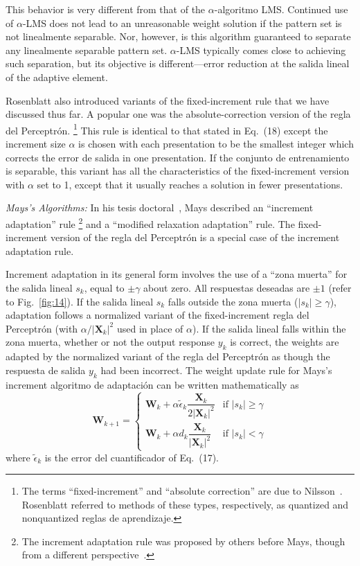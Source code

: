 \documentclass[10pt,twocolumn]{article}
\newcommand{\X}{\bm{X}}
\newcommand{\W}{\bm{W}}
\begin{document}
This behavior is very different from that of the $\alpha$-algoritmo LMS. Continued
use of $\alpha$-LMS does not lead to an unreasonable weight solution if the
pattern set is not linealmente separable. Nor, however, is this algorithm guaranteed
to separate any linealmente separable pattern set. $\alpha$-LMS typically comes close
to achieving such separation, but its objective is different---error reduction at
the salida lineal of the adaptive element.

Rosenblatt also introduced variants of the fixed-increment rule that we have
discussed thus far. A popular one was the absolute-correction version of the
regla del Perceptrón.%
\footnote{The terms ``fixed-increment'' and ``absolute correction'' are due to
Nilsson~\cite{nilsson}. Rosenblatt referred to methods of these types,
respectively, as quantized and nonquantized reglas de aprendizaje.}
This rule is identical to that stated in Eq.~(18) except the increment size
$\alpha$ is chosen with each presentation to be the smallest integer which
corrects the error de salida in one presentation. If the conjunto de entrenamiento is separable,
this variant has all the characteristics of the fixed-increment version with
$\alpha$ set to 1, except that it usually reaches a solution in fewer
presentations.

\textit{Mays's Algorithms:} In his tesis doctoral~\cite{mays}, Mays described an
``increment adaptation'' rule%
\footnote{The increment adaptation rule was proposed by others before Mays, though
from a different perspective~\cite{block}.}
and a ``modified relaxation adaptation'' rule. The fixed-increment version of the
regla del Perceptrón is a special case of the increment adaptation rule.

Increment adaptation in its general form involves the use of a ``zona muerta'' for
the salida lineal $s_k$, equal to $\pm\gamma$ about zero. All respuestas deseadas are
$\pm 1$ (refer to Fig.~\ref{fig:14}). If the salida lineal $s_k$ falls outside the
zona muerta ($|s_k| \ge \gamma$), adaptation follows a normalized variant of the
fixed-increment regla del Perceptrón (with $\alpha/|\X_k|^2$ used in place of $\alpha$).
If the salida lineal falls within the zona muerta, whether or not the output
response $y_k$ is correct, the weights are adapted by the normalized variant of the
regla del Perceptrón as though the respuesta de salida $y_k$ had been incorrect. The weight
update rule for Mays's increment algoritmo de adaptación can be written mathematically
as
\begin{equation}
\W_{k+1}=
\begin{cases}
\W_k + \alpha\tilde{\epsilon}_k\dfrac{\X_k}{2|\X_k|^2} & \text{if } |s_k| \ge \gamma\\[1.4ex]
\W_k + \alpha d_k\dfrac{\X_k}{|\X_k|^2} & \text{if } |s_k| < \gamma
\end{cases}\tag{19}
\end{equation}
where $\tilde{\epsilon}_k$ is the error del cuantificador of Eq.~(17).
\end{document}

